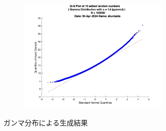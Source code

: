 \begin{figure}
\begin{subfigure}{0.48\linewidth}
		\label{fig:cl-gamma-added}
	\end{subfigure}
	\begin{subfigure}{0.48\linewidth}
		\centering
		\includegraphics[width=0.8\textwidth]{src/figures/cl-gamma/cl_added_gamrnd_qqpl_N=100000.jpg}
		\label{fig:cl-gamma-added-qqpl}
	\end{subfigure}
	\caption{ガンマ分布による生成結果}\label{fig:cl-gamma-random}
\end{figure}
